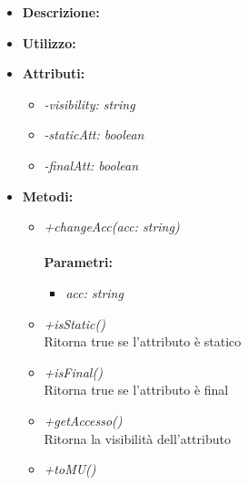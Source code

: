 \begin{itemize}
	\item \textbf{Descrizione:}\\
	
	\item \textbf{Utilizzo:}\\
	
	\item \textbf{Attributi:}
		\begin{itemize}
			\item \emph{-visibility: string}\\
			
			\item \emph{-staticAtt: boolean}\\
			
			\item \emph{-finalAtt: boolean}\\
			
		\end{itemize}
	\item \textbf{Metodi:}
		\begin{itemize}
			\item \emph{+changeAcc(acc: string)}\\
    		\\
    		\textbf{Parametri:}
    		\begin{itemize}
    			\item \emph{acc: string}\\
    			
    		\end{itemize}
    		\item \emph{+isStatic()}\\
    		Ritorna true se l'attributo è statico
    		\item \emph{+isFinal()}\\
    		Ritorna true se l'attributo è final
    		\item \emph{+getAccesso()}\\
    		Ritorna la visibilità dell'attributo
    		\item \emph{+toMU()}\\
    		
    	\end{itemize}
\end{itemize}